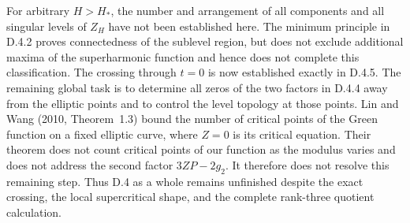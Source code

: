 \begin{problem}[D.4.6; Open]
For arbitrary \(H>H_*\), the number and arrangement of all components
and all singular levels of \(Z_H\) have not been established here.
The minimum principle in D.4.2 proves connectedness of the sublevel
region, but does not exclude additional maxima of the superharmonic
function and hence does not complete this classification. The
crossing through \(t=0\) is now established exactly in D.4.5.
The remaining global task is to determine all zeros of the two
factors in D.4.4 away from the elliptic points and to control the
level topology at those points. Lin and Wang (2010, Theorem~1.3)
bound the number of critical points of the Green function on a fixed
elliptic curve, where \(Z=0\) is its critical equation. Their theorem
does not count critical points of our function as the modulus varies
and does not address the second factor \(3ZP-2g_2\). It therefore
does not resolve this remaining step. Thus D.4 as a whole remains
unfinished despite the exact crossing, the local supercritical shape,
and the complete rank-three quotient calculation.
\end{problem}
